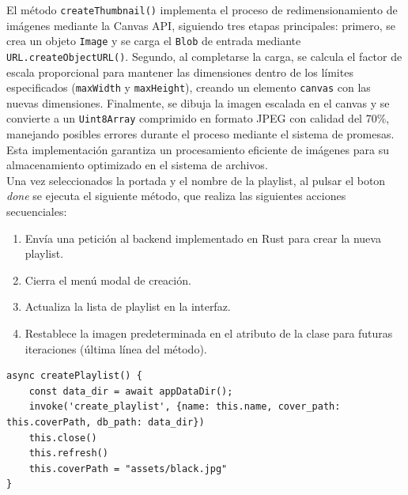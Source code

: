 \documentclass[11pt, a4paper]{article}
\begin{document}
                El método \texttt{createThumbnail()} implementa el proceso de redimensionamiento de imágenes mediante la Canvas API, siguiendo tres etapas principales: primero, se crea un objeto \texttt{Image} y se carga el \texttt{Blob} de entrada mediante \texttt{URL.createObjectURL()}. Segundo, al completarse la carga, se calcula el factor de escala proporcional para mantener las dimensiones dentro de los límites especificados (\texttt{maxWidth} y \texttt{maxHeight}), creando un elemento \texttt{canvas} con las nuevas dimensiones. Finalmente, se dibuja la imagen escalada en el canvas y se convierte a un \texttt{Uint8Array} comprimido en formato JPEG con calidad del 70\%, manejando posibles errores durante el proceso mediante el sistema de promesas. Esta implementación garantiza un procesamiento eficiente de imágenes para su almacenamiento optimizado en el sistema de archivos. \\

                Una vez seleccionados la portada y el nombre de la playlist, al pulsar el boton \textit{done} se ejecuta el siguiente método, que realiza las siguientes acciones secuenciales:

                \begin{enumerate}
                    \item Envía una petición al backend implementado en Rust para crear la nueva playlist.
                    \item Cierra el menú modal de creación.
                    \item Actualiza la lista de playlist en la interfaz.
                    \item Restablece la imagen predeterminada en el atributo de la clase para futuras iteraciones (última línea del método).
                \end{enumerate}

                \begin{lstlisting}[caption={createPlaylist()}]
async createPlaylist() {
    const data_dir = await appDataDir();
    invoke('create_playlist', {name: this.name, cover_path: this.coverPath, db_path: data_dir})
    this.close()
    this.refresh()
    this.coverPath = "assets/black.jpg"
}
                \end{lstlisting}
                ‎ \\ \\ \\ \\ \\ \\
\end{document}
